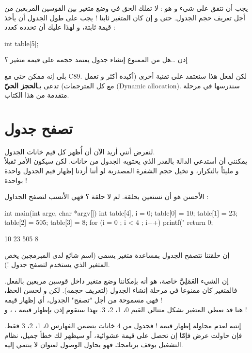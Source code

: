 يجب أن نتفق على شيء و هو : لا تملك الحق في وضع متغير بين القوسين المربعين من أجل تعريف حجم الجدول. حتى و إن كان المتغير ثابتا ! يجب على طول الجدول أن يأخذ قيمة ثابتة، و لهذا عليك أن تحدده كعدد :
\begin{Csource}
int table[5];
\end{Csource}
\begin{question}
   إذن \dots هل من الممنوع إنشاء جدول يعتمد حجمه على قيمة متغير ؟
\end{question}
بلى إنه ممكن حتى مع
\textenglish{C89}.
لكن لفعل هذا سنعتمد على تقنية أخرى (أكيدة أكثر و تعمل مع كل المترجمات) تدعى بـ\textbf{الحجز الحيّ}
(\textenglish{Dynamic allocation}).
سندرسها في مرحلة متقدمة من هذا الكتاب.

\section{تصفح جدول}

لنفرض أنني أريد الآن أن أُظهر كل قيم خانات الجدول.\\
يمكنني أن أستدعي الدالة
بالقدر الذي يحتويه الجدول من خانات. لكن سيكون الأمر ثقيلاً و مليئاً بالتكرار، و تخيل حجم الشفرة المصدرية لو أننا أردنا إظهار قيم الجدول واحدة بواحدة !

الأحسن هو أن نستعين بحلقة. لم لا حلقة
؟ فهي الأنسب لتصفح الجداول :

\begin{Csource}
int main(int argc, char *argv[])
{
	int table[4], i = 0;
	table[0] = 10;
	table[1] = 23;
	table[2] = 505;
	table[3] = 8;
	for (i = 0 ; i < 4 ; i++)
	{
    		printf("%
	}
	return 0;
}
\end{Csource}

\begin{Console}
10
23
505
8
\end{Console}

إن حلقتنا تتصفح الجدول بمساعدة متغير يسمى
(اسم شائع لدى المبرمجين يخص المتغير الذي يستخدم لتصفح جدول !).

إن الشيء العَمَلِيَّ خاصة، هو أنه بإمكاننا وضع متغير داخل قوسين مربعين بالفعل. فالمتغير كان ممنوعا في مرحلة إنشاء الجدول (لتعريف حجمه). لكن و لحسن الحظ، فهي مسموحة من أجل "تصفح" الجدول، أي إظهار قيمه !\\
هنا قد نعطي المتغير
بشكل متتالي القيم 0، 1، 2، 3. بهذا سنقوم إذن بإظهار قيمة
،
،
و
 !

\begin{critical}
  إنتبه لعدم محاولة إظهار قيمة
 !
فجدول من 4 خانات يتضمن الفهارس 0، 1، 2، 3 فقط. فإن حاولت عرض
فإمّا إن تحصل على قيمة عشوائية، أو سيظهر لك خطأ جميل، نظام التشغيل يوقف برنامجك فهو يحاول الوصول لعنوان لا ينتمي إليه.
\end{critical}


